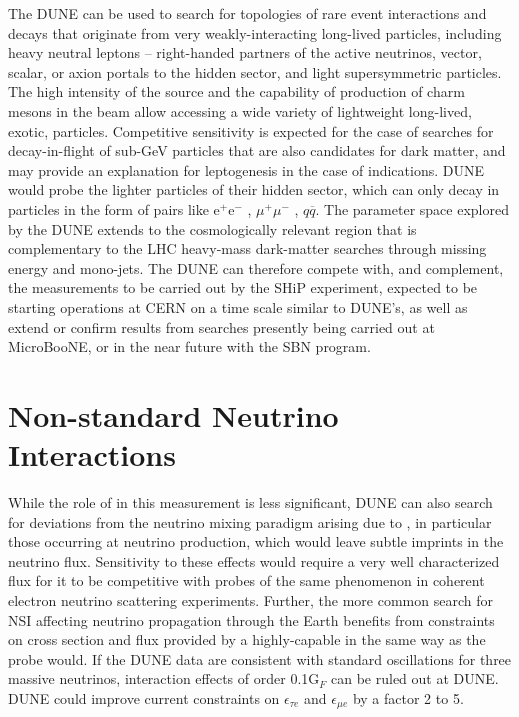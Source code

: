 The DUNE  can be used to search for topologies of rare event interactions and decays that originate from very weakly-interacting long-lived particles, including heavy neutral leptons -- right-handed partners of the active neutrinos, vector, scalar, or axion portals to the hidden sector, and light supersymmetric particles. The high intensity of the  source and the capability of  production of charm mesons in the beam allow accessing a wide variety of lightweight long-lived, exotic, particles. Competitive sensitivity is expected for the case of searches for decay-in-flight of sub-GeV particles that are also candidates for dark matter, and may provide an explanation for leptogenesis in the case of  indications. DUNE would probe the lighter particles of their hidden sector, which can only decay in  particles in the form of pairs like e$^{+}$e$^{-}$  , $\mu^{+}\mu^{-}$ , $q\overline{q}$. The parameter space explored by the DUNE  extends to the cosmologically relevant region that is complementary to the LHC heavy-mass dark-matter searches through missing energy and mono-jets. The DUNE  can therefore compete with, and complement, the measurements to be carried out by the SHiP experiment, expected to be starting operations at CERN on a time scale similar to DUNE's, as well as extend or confirm results from searches presently being carried out at MicroBooNE, or in the near future with the SBN program.

\section{Non-standard Neutrino Interactions}
\label{ssec:exsum-nd-BSMappendix-NSI}

While the role of  in this measurement is less significant, DUNE can also search for deviations from the  neutrino mixing paradigm arising due to , in particular those occurring at neutrino production, which would leave subtle imprints in the neutrino flux. Sensitivity to these effects would require a very well characterized flux for it to be competitive with probes of the same phenomenon in coherent electron neutrino scattering experiments. Further, the more common search for NSI affecting neutrino propagation through the Earth benefits from constraints on cross section and flux provided by a highly-capable  in the same way as the  probe would. If the DUNE data are consistent with standard oscillations for three massive neutrinos, interaction effects of order 0.1G$_{F}$   can be ruled out at DUNE. DUNE could improve current constraints on $\epsilon_{\tau e}$ and $\epsilon_{\mu e}$ by a factor 2 to 5.



